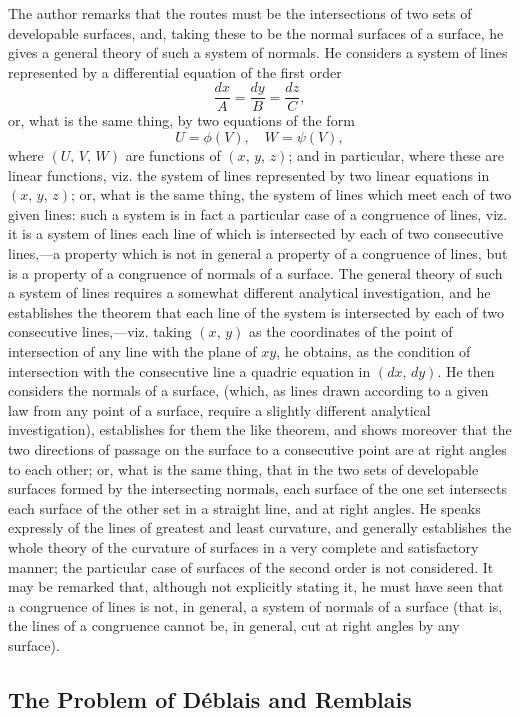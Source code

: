 \documentclass[11pt,a4paper]{book}
\begin{document}
The author remarks that the routes must be the intersections of two sets of developable surfaces, and, taking these to be the normal surfaces of a surface, he gives a general theory of such a system of normals. He considers a system of lines represented by a differential equation of the first order
\[
\frac{dx}{A} = \frac{dy}{B} = \frac{dz}{C},
\]
or, what is the same thing, by two equations of the form
\[
U = \phi(V),\quad W = \psi(V),
\]
where $(U,\, V,\, W)$ are functions of $(x,\, y,\, z)$; and in particular, where these are linear functions, viz. the system of lines represented by two linear equations in $(x,\, y,\, z)$; or, what is the same thing, the system of lines which meet each of two given lines: such a system is in fact a particular case of a congruence of lines, viz. it is a system of lines each line of which is intersected by each of two consecutive lines,---a property which is not in general a property of a congruence of lines, but is a property of a congruence of normals of a surface. The general theory of such a system of lines requires a somewhat different analytical investigation, and he establishes the theorem that each line of the system is intersected by each of two consecutive lines,---viz. taking $(x,\, y)$ as the coordinates of the point of intersection of any line with the plane of $xy$, he obtains, as the condition of intersection with the consecutive line a quadric equation in $(dx,\, dy)$. He then considers the normals of a surface, (which, as lines drawn according to a given law from any point of a surface, require a slightly different analytical investigation), establishes for them the like theorem, and shows moreover that the two directions of passage on the surface to a consecutive point are at right angles to each other; or, what is the same thing, that in the two sets of developable surfaces formed by the intersecting normals, each surface of the one set intersects each surface of the other set in a straight line, and at right angles. He speaks expressly of the lines of greatest and least curvature, and generally establishes the whole theory of the curvature of surfaces in a very complete and satisfactory manner; the particular case of surfaces of the second order is not considered. It may be remarked that, although not explicitly stating it, he must have seen that a congruence of lines is not, in general, a system of normals of a surface (that is, the lines of a congruence cannot be, in general, cut at right angles by any surface).

\subsection*{The Problem of D\'{e}blais and Remblais}
\end{document}
